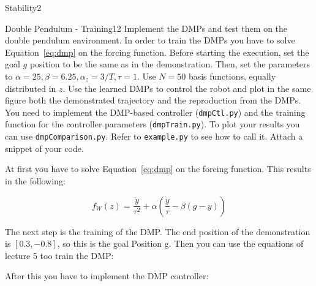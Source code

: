\begin{questions}
\begin{question}{Stability}{2}
\end{question}


\begin{question}{Double Pendulum - Training}{12}
Implement the DMPs and test them on the double pendulum environment.
In order to train the DMPs you have to solve Equation~\eqref{eq:dmp} on the forcing function. Before starting the execution, set the goal $g$ position to be the same as in the demonstration. Then, set the parameters to $\alpha=25, \beta=6.25, \alpha_z=3/T, \tau=1$. Use $N=50$ basis functions, equally distributed in $z$.  Use the learned DMPs to control the robot and plot in the same figure both the demonstrated trajectory and the reproduction from the DMPs.
You need to implement the DMP-based controller (\texttt{dmpCtl.py}) and the training function for the controller parameters (\texttt{dmpTrain.py}). To plot your results you can use \texttt{dmpComparison.py}. Refer to \texttt{example.py} to see how to call it. Attach a snippet of your code.

\begin{answer}
At first you have to solve Equation~\eqref{eq:dmp} on the forcing function. This results in the following:

\begin{equation}
	f_W(z) = \frac{\ddot{y}}{\tau^2}+\alpha (\frac{\dot{y}}{\tau} - \beta (g-y))
\end{equation}

The next step is the training of the DMP. The end position of the demonstration is $[0.3, -0.8]$, so this is the goal Position g. Then you can use the equations of lecture 5 too train the DMP:



After this you have to implement the DMP controller:




\end{answer}
\end{question}
\end{questions}
